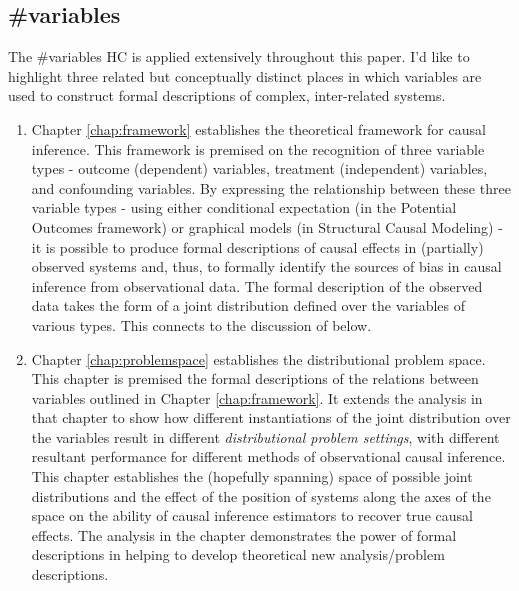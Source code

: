 \documentclass[./main.tex]{subfiles}
\begin{document}
\subsection*{\textbf{\#variables}}
\label{hc:variables}

The \#variables HC is applied extensively throughout this paper. I'd like to highlight three related but conceptually distinct places in which variables are used to construct formal descriptions of complex, inter-related systems.

\begin{enumerate}
    \item Chapter \ref{chap:framework} establishes the theoretical framework for causal inference. This framework is premised on the recognition of three variable types - outcome (dependent) variables, treatment (independent) variables, and confounding variables. By expressing the relationship between these three variable types - using either conditional expectation (in the Potential Outcomes framework) or graphical models (in Structural Causal Modeling) - it is possible to produce formal descriptions of causal effects in (partially) observed systems and, thus, to formally identify the sources of bias in causal inference from observational data. The formal description of the observed data takes the form of a joint distribution defined over the variables of various types. This connects to the discussion of  below.
    
    \item Chapter \ref{chap:problemspace} establishes the distributional problem space. This chapter is premised the formal descriptions of the relations between variables outlined in Chapter \ref{chap:framework}. It extends the analysis in that chapter to show how different instantiations of the joint distribution over the variables result in different \textit{distributional problem settings}, with different resultant performance for different methods of observational causal inference. This chapter establishes the (hopefully spanning) space of possible joint distributions and the effect of the position of systems along the axes of the space on the ability of causal inference estimators to recover true causal effects. The analysis in the chapter demonstrates the power of formal descriptions in helping to develop theoretical new analysis/problem descriptions.
    

\end{enumerate}
\end{document}

